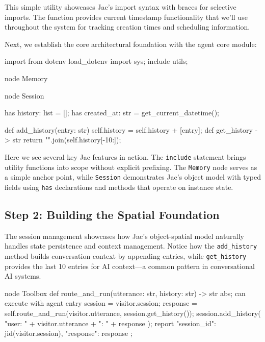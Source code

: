 This simple utility showcases Jac's import syntax with braces for selective imports. The function provides current timestamp functionality that we'll use throughout the system for tracking creation times and scheduling information.

Next, we establish the core architectural foundation with the agent core module:

\begin{jacblock}
import from dotenv { load_dotenv }
import sys;
include utils;

node Memory {}

node Session {
    has history: list = [];
    has created_at: str = get_current_datetime();

    def add_history(entry: str) {
        self.history = self.history + [entry];
    }
    def get_history -> str {
        return "\n".join(self.history[-10:]);
    }
}
\end{jacblock}

Here we see several key Jac features in action. The \texttt{include} statement brings utility functions into scope without explicit prefixing. The \texttt{Memory} node serves as a simple anchor point, while \texttt{Session} demonstrates Jac's object model with typed fields using \texttt{has} declarations and methods that operate on instance state.

\subsection{Step 2: Building the Spatial Foundation}

The session management showcases how Jac's object-spatial model naturally handles state persistence and context management. Notice how the \texttt{add\_history} method builds conversation context by appending entries, while \texttt{get\_history} provides the last 10 entries for AI context—a common pattern in conversational AI systems.

\begin{jacblock}
node Toolbox {
    def route_and_run(utterance: str, history: str) -> str abs;
    can execute with agent entry {
        session = visitor.session;
        response = self.route_and_run(visitor.utterance, session.get_history());
        session.add_history(
            "user: " + visitor.utterance + "\nai: " + response
        );
        report {
            "session_id": jid(visitor.session),
            "response": response
        };
    }
}
\end{jacblock}

